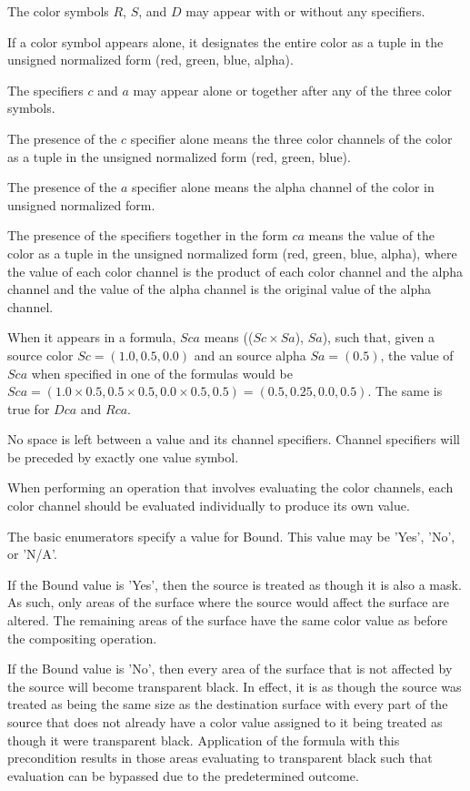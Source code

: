 \pnum
The color symbols $R$, $S$, and $D$ may appear with or without any specifiers.

\pnum 
If a color symbol appears alone, it designates the entire color as a tuple in 
the unsigned normalized form (red, green, blue, alpha).

\pnum
The specifiers $c$ and $a$ may appear alone or together after any of the three 
color symbols.

\pnum
The presence of the $c$ specifier alone means the three color channels of the 
color as a tuple in the unsigned normalized form (red, green, blue).

\pnum
The presence of the $a$ specifier alone means the alpha channel of the color in 
unsigned normalized form.

\pnum
The presence of the specifiers together in the form $ca$ means the 
value of the color as a tuple in the unsigned normalized form (red, green, 
blue, alpha), where the value of each color channel is the product of each 
color channel and the alpha channel and the value of the alpha channel is the 
original value of the alpha channel.
\begin{example}
When it appears in a formula, $Sca$ means (($Sc \times Sa$), $Sa$), such that, 
given a source color $Sc = (1.0, 0.5, 0.0)$ and an source alpha $Sa = (0.5)$, 
the value of $Sca$ when specified in one of the formulas would be $Sca = (1.0 
\times 0.5, 0.5 \times 0.5, 0.0 \times 0.5, 0.5) = (0.5, 0.25, 0.0, 0.5)$. The 
same is true for $Dca$ and $Rca$.
\end{example}

\pnum
No space is left between a value and its channel specifiers. Channel 
specifiers will be preceded by exactly one value symbol.

\pnum
When performing an operation that involves evaluating the color 
channels, each color channel should be evaluated individually to produce its 
own value.

\pnum
The basic enumerators specify a value for Bound. This value may be 'Yes', 
'No', or 'N/A'.

\pnum
If the Bound value is 'Yes', then the source is treated as though it is 
also a mask. As such, only areas of the surface where the source would affect 
the surface are altered. The remaining areas of the surface have the same color 
value as before the compositing operation.

\pnum
If the Bound value is 'No', then every area of the surface that is not 
affected by the source will become transparent black. In effect, it is as 
though the source was treated as being the same size as the destination surface 
with every part of the source that does not already have a color value assigned 
to it being treated as though it were transparent black. Application of the 
formula with this precondition results in those areas evaluating to transparent 
black such that evaluation can be bypassed due to the predetermined outcome.

